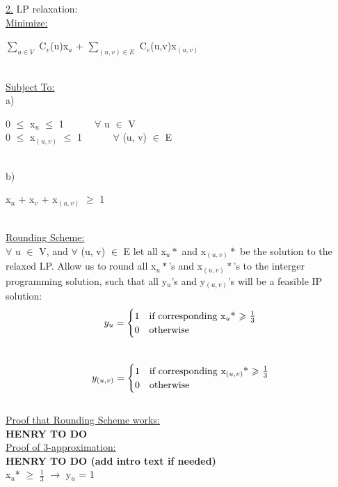 \documentclass[10pt]{csc_assignment}
\begin{document}
\begin{description}
\begin{flushleft}
\underline{2.} LP relaxation:\\
\underline{Minimize:}\\
\hspace*{1cm}\parbox{15cm}{
$\sum_{u \in V}$ C$_{v}$(u)x$_{u}$ + $\sum_{(u, v) \in E}$ C$_{e}$(u,v)x$_{(u, v)}$
}\\
\underline{Subject To:}\\
a) \\
\hspace*{1cm}\parbox{15cm}{
0 $\leqslant$ x$_{u}$ $\leqslant$ 1 ~~~~~ $\forall$ u $\in$ V\\ 
0 $\leqslant$ x$_{(u, v)}$ $\leqslant$ 1 ~~~~~ $\forall$ (u, v) $\in$ E\\ 
}\\
b)\\
\hspace*{1cm}\parbox{15cm}{
x$_{u}$ + x$_{v}$ + x$_{(u, v)}$ $\geqslant$ 1\\
}\\
\underline{Rounding Scheme:}\\
$\forall$ u $\in$ V, and $\forall$ (u, v) $\in$ E let all x$_{u}*$ and x$_{(u, v)}*$ be the solution to the relaxed LP. Allow us to round all x$_{u}*$'s and x$_{(u, v)}*$'s to the interger programming solution, such that all y$_{u}$'s and y$_{(u, v)}$'s will be a feasible IP solution:\\
\[
y_{u} = 
\begin{cases} 
      \hfill 1 \hfill & \text{if corresponding x$_{u}$* $\geqslant$ $\frac{1}{3}$} \\
      \hfill 0 \hfill & \text{otherwise} \\
  \end{cases}
\]\\
\[
y_{(u, v)} = 
\begin{cases} 
      \hfill 1 \hfill & \text{if corresponding x$_{(u, v)}$* $\geqslant$ $\frac{1}{3}$} \\
      \hfill 0 \hfill & \text{otherwise} \\
  \end{cases}
\]\\
\underline{Proof that Rounding Scheme works:}\\
\textbf{HENRY TO DO}\\
\underline{Proof of 3-approximation:}\\
\textbf{HENRY TO DO (add intro text if needed)}\\
x$_{u}$* $\geqslant$ $\frac{1}{3}$ $\rightarrow$ y$_{u}$ = 1\\

\end{flushleft}
\end{description}
\end{document}
